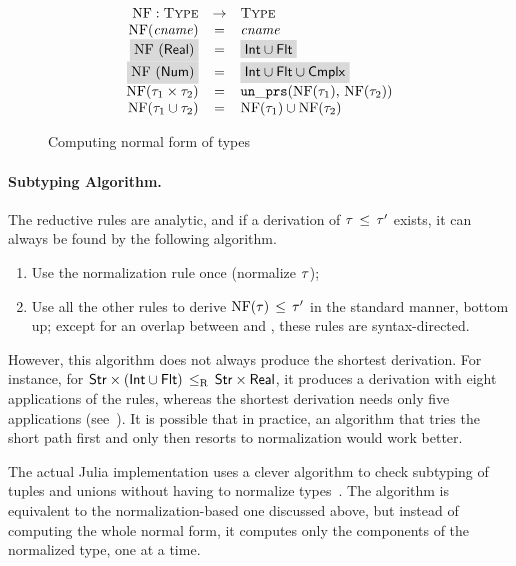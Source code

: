 \begin{figure}
  \[
	\begin{array}{rcl}
	\NF: \Type &\rightarrow& \Type \\
	\NF(\cname) &=& \cname \\
	\colorbox{light-gray}{\NF(\tyreal)} &=&
	\colorbox{light-gray}{\tyunion{\tyint}{\tyflt}} \\
	\colorbox{light-gray}{\NF(\tynum)} &=&
	\colorbox{light-gray}{\tyunion{\tyunion{\tyint}{\tyflt}}{\tycmplx}} \\
	\NF(\typair{\ty_1}{\ty_2}) &=& \unprs(\NF(\ty_1), \, \NF(\ty_2))	\\
	\NF(\tyunion{\ty_1}{\ty_2}) &=& \tyunion{\NF(\ty_1)}{\NF(\ty_2)} \\
	\end{array}
  \]
	\caption{Computing normal form of \BetaJulia types}
	\label{fig:bjsem-calc-nf}
\end{figure}

\paragraph{Subtyping Algorithm.}
The reductive rules are analytic,
and if a derivation of $\tau \, \leq \, \tau'$ exists,
it can always be found by the following algorithm.
\begin{enumerate}%
  \item Use the normalization rule  once (normalize $\tau$);
  \item Use all the other rules to derive 
    $\mathop{\mathrm{NF}}(\tau) \, \leq \, \tau'$ in the standard manner, bottom up;
    except for an overlap between  and ,
    these rules are syntax-directed.
\end{enumerate}

However, this algorithm does not always produce the shortest derivation.
For instance, for
$\mathsf{Str} \times (\mathsf{Int} \cup \mathsf{Flt}) \, \leq_\mathrm{R} \, \mathsf{Str} \times \mathsf{Real}$,
it produces a derivation with eight applications of the rules, 
whereas the shortest derivation needs only five applications
(see~).
It is possible that in practice, an algorithm that tries the short path first 
and only then resorts to normalization would work better.

The actual Julia implementation uses a clever algorithm 
to check subtyping of tuples and unions 
without having to normalize types~\cite{bib:Chung19}.
The algorithm is equivalent to the normalization-based one discussed above,
but instead of computing the whole normal form, 
it computes only the components of the normalized type, one at a time.

